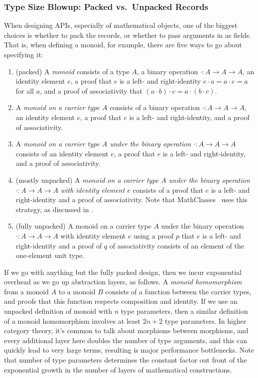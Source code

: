 \subsubsection{Type Size Blowup: Packed vs.\ Unpacked Records} \label{sec:abstraction-barriers:packed-records}
When designing APIs, especially of mathematical objects, one of the biggest choices is whether to pack the records, or whether to pass arguments in as fields.
That is, when defining a monoid, for example, there are five ways to go about specifying it:
\begin{enumerate}
    \item
    (packed)
    A \emph{monoid} consists of a type $A$, a binary operation $\cdot : A \to A \to A$, an identity element $e$, a proof that $e$ is a left- and right-identity $e \cdot a = a \cdot e = a$ for all $a$, and a proof of associativity that $(a \cdot b) \cdot c = a \cdot (b \cdot c)$.
    \item
    A \emph{monoid on a carrier type $A$} consists of a binary operation $\cdot : A \to A \to A$, an identity element $e$, a proof that $e$ is a left- and right-identity, and a proof of associativity.
    \item
    A \emph{monoid on a carrier type $A$ under the binary operation $\cdot : A \to A \to A$} consists of an identity element $e$, a proof that $e$ is a left- and right-identity, and a proof of associativity.
    \item
    (mostly unpacked)
    A \emph{monoid on a carrier type $A$ under the binary operation $\cdot : A \to A \to A$ with identity element $e$} consists of a proof that $e$ is a left- and right-identity and a proof of associativity.
    Note that MathClasses~\cite{MathClasses,Type2011Spitters} uses this strategy, as discussed in \textcite{Packaging2009Garillot}.
    \item
    (fully unpacked) A monoid on a carrier type $A$ under the binary operation $\cdot : A \to A \to A$ with identity element $e$ using a proof $p$ that $e$ is a left- and right-identity and a proof of $q$ of associativity consists of an element of the one-element unit type.
\end{enumerate}

If we go with anything but the fully packed design, then we incur exponential overhead as we go up abstraction layers, as follows.
A \emph{monoid homomorphism} from a monoid $A$ to a monoid $B$ consists of a function between the carrier types, and proofs that this function respects composition and identity.
If we use an unpacked definition of monoid with $n$ type parameters, then a similar definition of a monoid homomorphism involves at least $2n+2$ type parameters.
In higher category theory, it's common to talk about morphisms between morphisms, and every additional layer here doubles the number of type arguments, and this can quickly lead to very large terms, resulting is major performance bottlenecks.
Note that number of type parameters determines the constant factor out front of the exponential growth in the number of layers of mathematical constructions.

